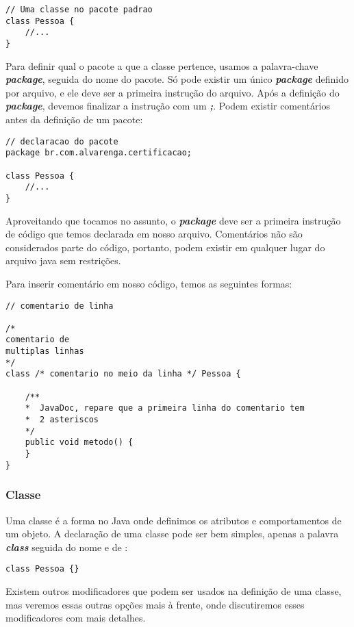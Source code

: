 \documentclass[12pt]{article}
\begin{document}
\begin{lstlisting}
// Uma classe no pacote padrao
class Pessoa {
	//...
}
\end{lstlisting}

Para definir qual o pacote a que a classe pertence, usamos a palavra-chave \textbf{\textit{package}}, seguida do nome do pacote. Só pode existir um único \textbf{\textit{package}} definido por arquivo, e ele deve ser a primeira instrução do arquivo. Após a definição do \textbf{\textit{package}}, devemos finalizar a instrução com um \textbf{\textit{;}}. Podem existir comentários antes da definição de um pacote:

\begin{lstlisting}
// declaracao do pacote
package br.com.alvarenga.certificacao;
	
class Pessoa {
	//...
}
\end{lstlisting}

Aproveitando que tocamos no assunto, o \textbf{\textit{package}} deve ser a primeira instrução de código que temos declarada em nosso arquivo. Comentários não são considerados parte do código, portanto, podem existir em qualquer lugar do arquivo java sem restrições.

Para inserir comentário em nosso código, temos as seguintes formas:

\begin{lstlisting}
// comentario de linha

/*
comentario de
multiplas linhas
*/
class /* comentario no meio da linha */ Pessoa {
	
	/**
	*  JavaDoc, repare que a primeira linha do comentario tem
	*  2 asteriscos
	*/
	public void metodo() {
	}
}
\end{lstlisting}

\subsubsection{Classe}

Uma classe é a forma no Java onde definimos os atributos e comportamentos de um objeto. A declaração de uma classe pode ser bem simples, apenas a palavra \textbf{\textit{class}} seguida do nome e de \textbf{\textit{{}}}:

\begin{lstlisting}
class Pessoa {}
\end{lstlisting}

Existem outros modificadores que podem ser usados na definição de uma classe, mas veremos essas outras opções mais à frente, onde discutiremos esses modificadores com mais detalhes.
\end{document}

